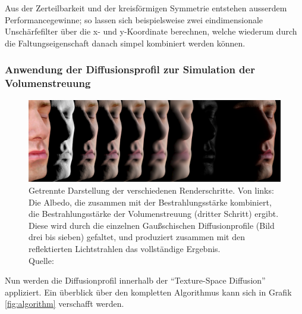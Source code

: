 \documentclass[ngerman,runningheads,a4paper]{llncs}[2018/03/10]
\begin{document}
Aus der Zerteilbarkeit und der kreisförmigen Symmetrie entstehen ausserdem Performancegewinne; so lassen sich beispielsweise zwei eindimensionale Unschärfefilter über die x- und y-Koordinate berechnen, welche wiederum durch die Faltungseigenschaft danach simpel kombiniert werden können.

\subsubsection{Anwendung der Diffusionsprofil zur Simulation der Volumenstreuung}

\begin{figure}
  \centering
  \includegraphics[scale=0.3,keepaspectratio]{./images/human-skin-final-rendering.jpg}
  \caption{Getrennte Darstellung der verschiedenen Renderschritte. Von links: Die Albedo, die zusammen mit der Bestrahlungsstärke kombiniert, die Bestrahlungsstärke der Volumenstreuung (dritter Schritt) ergibt. Diese wird durch die einzelnen Gaußschischen Diffusionprofile (Bild drei bis sieben) gefaltet, und produziert zusammen mit den reflektierten Lichtstrahlen das vollständige Ergebnis.\\\hspace{\textwidth}Quelle: \cite{efficient-human-skin-rendering}}
  \label{fig:whole-algorithm-rendered}
\end{figure}

Nun werden die Diffusionprofil innerhalb der \enquote{Texture-Space Diffusion} appliziert.
Ein überblick über den kompletten Algorithmus kann sich in Grafik \ref{fig:algorithm} verschafft werden.
\end{document}
